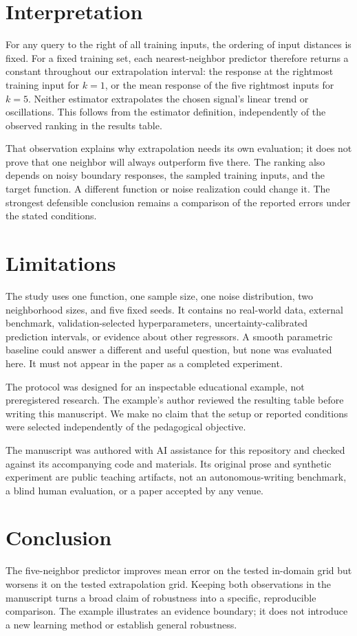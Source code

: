 \documentclass[
  10pt,
  letterpaper,
]{article}
\newcounter{none} %
\begin{document}
\section{Interpretation}\label{interpretation}

For any query to the right of all training inputs, the ordering of input
distances is fixed. For a fixed training set, each nearest-neighbor
predictor therefore returns a constant throughout our extrapolation
interval: the response at the rightmost training input for \(k=1\), or
the mean response of the five rightmost inputs for \(k=5\). Neither
estimator extrapolates the chosen signal's linear trend or oscillations.
This follows from the estimator definition, independently of the
observed ranking in the results table.

That observation explains why extrapolation needs its own evaluation; it
does not prove that one neighbor will always outperform five there. The
ranking also depends on noisy boundary responses, the sampled training
inputs, and the target function. A different function or noise
realization could change it. The strongest defensible conclusion remains
a comparison of the reported errors under the stated conditions.

\section{Limitations}\label{limitations}

The study uses one function, one sample size, one noise distribution,
two neighborhood sizes, and five fixed seeds. It contains no real-world
data, external benchmark, validation-selected hyperparameters,
uncertainty-calibrated prediction intervals, or evidence about other
regressors. A smooth parametric baseline could answer a different and
useful question, but none was evaluated here. It must not appear in the
paper as a completed experiment.

The protocol was designed for an inspectable educational example, not
preregistered research. The example's author reviewed the resulting
table before writing this manuscript. We make no claim that the setup or
reported conditions were selected independently of the pedagogical
objective.

The manuscript was authored with AI assistance for this repository and
checked against its accompanying code and materials. Its original prose
and synthetic experiment are public teaching artifacts, not an
autonomous-writing benchmark, a blind human evaluation, or a paper
accepted by any venue.

\section{Conclusion}\label{conclusion}

The five-neighbor predictor improves mean error on the tested in-domain
grid but worsens it on the tested extrapolation grid. Keeping both
observations in the manuscript turns a broad claim of robustness into a
specific, reproducible comparison. The example illustrates an evidence
boundary; it does not introduce a new learning method or establish
general robustness.


\end{document}
